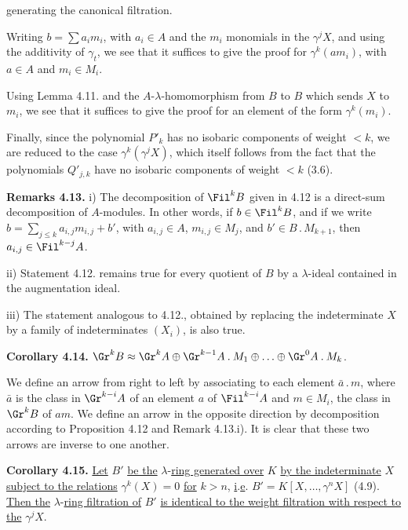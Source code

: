 %
generating the canonical filtration.

Writing \(b=\sum a_i m_i\), with \(a_i\in A\) and the \(m_i\) monomials in the \(\gamma^j X\), and using the additivity of \(\gamma_t\), we see that it suffices to give the proof for \(\gamma^k(am_i)\), with \(a\in A\) and \(m_i\in M_i\).

Using Lemma 4.11. and the \(A\)-\(\lambda\)-homomorphism from \(B\) to \(B\) which sends \(X\) to \(m_i\), we see that it suffices to give the proof for an element of the form \(\gamma^k(m_i)\).

Finally, since the polynomial \(P'_k\) has no isobaric components of weight \(<k\), we are reduced to the case \(\gamma^k(\gamma^j X)\), which itself follows from the fact that the polynomials \(Q'_{j,k}\) have no isobaric components of weight \(<k\) (3.6).

\textbf{Remarks 4.13.} i) The decomposition of \(\Fil^k B\) given in 4.12 is a direct-sum decomposition of \(A\)-modules. In other words, if \(b\in\Fil^k B\), and if we write \(b=\sum_{j\le k}a_{i,j}m_{i,j}+b'\), with \(a_{i,j}\in A\), \(m_{i,j}\in M_j\), and \(b'\in B\mathbin{.}M_{k+1}\), then \(a_{i,j}\in\Fil^{k-j}A\).

ii) Statement 4.12. remains true for every quotient of \(B\) by a \(\lambda\)-ideal contained in the augmentation ideal.

iii) The statement analogous to 4.12., obtained by replacing the indeterminate \(X\) by a family of indeterminates \((X_i)\), is also true.

\textbf{Corollary 4.14.} \(\Gr^k B\approx\Gr^k A\oplus\Gr^{k-1}A\mathbin{.}M_1\oplus\ldots\oplus\Gr^0 A\mathbin{.}M_k\).

We define an arrow from right to left by associating to each element \(\bar a\mathbin{.}m\), where \(\bar a\) is the class in \(\Gr^{k-i}A\) of an element \(a\) of \(\Fil^{k-i}A\) and \(m\in M_i\), the class in \(\Gr^k B\) of \(am\). We define an arrow in the opposite direction by decomposition according to Proposition 4.12 and Remark 4.13.i). It is clear that these two arrows are inverse to one another.

%
\textbf{Corollary 4.15.} \uline{Let} \(B'\) \uline{be the} \(\lambda\)-\uline{ring generated over} \(K\) \uline{by the indeterminate} \(X\) \uline{subject to the relations} \(\gamma^k(X)=0\) \uline{for} \(k>n\), \uline{i}.\uline{e}. \(B'=K[X,\ldots,\gamma^n X]\) (4.9). \uline{Then the} \(\lambda\)-\uline{ring filtration of} \(B'\) \uline{is identical to the weight filtration with respect to the} \(\gamma^j X\).

